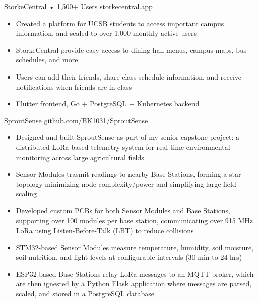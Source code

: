 \documentclass[9pt]{developercv} %
\begin{document}
\begin{entrylist}
    \entry
		{}
		{StorkeCentral • 1,500+ Users}
		{storkecentral.app}
        {\vspace{-8pt}
        \begin{itemize}[noitemsep,topsep=0pt,parsep=0pt,partopsep=0pt, leftmargin=10pt]
            \item Created a platform for UCSB students to access important campus information, and scaled to over 1,000 monthly active users
            \item StorkeCentral provide easy access to dining hall menus, campus maps, bus schedules, and more
            \item Users can add their friends, share class schedule information, and receive notifications when friends are in class
            \item Flutter frontend, Go + PostgreSQL + Kubernetes backend
        \end{itemize}}
    \entry
		{}
		{SproutSense}
		{github.com/BK1031/SproutSense}
		{\vspace{-8pt}
        \begin{itemize}[noitemsep,topsep=0pt,parsep=0pt,partopsep=0pt, leftmargin=10pt]
            \item Designed and built SproutSense as part of my senior capstone project: a distributed LoRa-based telemetry system for real-time environmental monitoring across large agricultural fields
            \item Sensor Modules trasmit readings to nearby Base Stations, forming a star topology minimizing node complexity/power and simplifying large-field scaling
            \item Developed custom PCBs for both Sensor Modules and Base Stations, supporting over 100 modules per base station, communicating over 915 MHz LoRa using Listen-Before-Talk (LBT) to reduce collisions
            \item STM32-based Sensor Modules measure temperature, humidity, soil moisture, soil nutrition, and light levels at configurable intervals (30 min to 24 hrs)
            \item ESP32-based Base Stations relay LoRa messages to an MQTT broker, which are then ignested by a Python Flask application where messages are parsed, scaled, and stored in a PostgreSQL database

\end{itemize}}
\end{entrylist}
\end{document}
